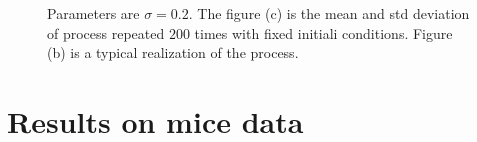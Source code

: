 \begin{figure}[H]
\centering
{}
\hfill
{}
\hfill
{}
\caption{Parameters are $\sigma = 0.2$. The figure (c) is the mean and std deviation of process repeated $200$ times with fixed initiali conditions. Figure (b) is a typical realization of the process. }
\end{figure}



\section{Results on mice data}